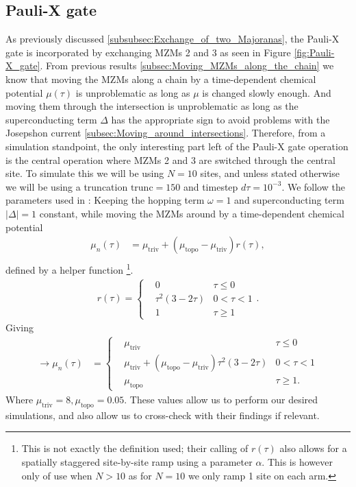 \subsection{Pauli-X gate}
As previously discussed \ref{subsubsec:Exchange_of_two_Majoranas}, the Pauli-X gate is incorporated by exchanging MZMs 2 and 3 as seen in Figure \ref{fig:Pauli-X_gate}. From previous results \ref{subsec:Moving_MZMs_along_the_chain} we know that moving the MZMs along a chain by a time-dependent chemical potential $\mu(\tau)$ is unproblematic as long as $\mu$ is changed slowly enough. And moving them through the intersection is unproblematic as long as the superconducting term $\Delta$ has the appropriate sign to avoid problems with the Josepshon current \ref{subsec:Moving_around_intersections}. Therefore, from a simulation standpoint, the only interesting part left of the Pauli-X gate operation is the central operation where MZMs 2 and 3 are switched through the central site. To simulate this we will be using $N = 10$ sites, and unless stated otherwise we will be using a truncation $\text{trunc} = 150$ and timestep $d\tau = 10^{-3}$. We follow the parameters used in \cite{sahuNoisyBraidingMajorana2026}: Keeping the hopping term $\omega = 1$ and superconducting term $|\Delta| = 1$ constant, while moving the MZMs around by a time-dependent chemical potential 
\begin{align}
  \mu_n(\tau) &= \mu_\text{triv} + \left(\mu_\text{topo} - \mu_\text{triv} \right) r(\tau), \\
\end{align}
defined by a helper function \footnote{This is not exactly the definition \cite{sahuNoisyBraidingMajorana2026} used; their calling of $r(\tau)$ also allows for a spatially staggered site-by-site ramp using a parameter $\alpha$. This is however only of use when $N > 10$ as for $N=10$ we only ramp 1 site on each arm.}. 
\begin{align}
  r(\tau) = \left\{
  \begin{aligned}
    & 0 & \tau \leq 0 \\
    & \tau^2 (3 - 2 \tau)  & 0 < \tau < 1\\
    & 1 & \tau \geq 1
  \end{aligned} \label{eq:r(tau)_Pauli_x}
  \right. .
\end{align}
Giving 
\begin{align}
  \to \mu_n(\tau) &= \left\{
  \begin{aligned}
    & \mu_\text{triv}  & \tau \leq 0 \\
    & \mu_\text{triv} + \left( \mu_\text{topo} - \mu_\text{triv} \right) \tau^2 (3 - 2 \tau)  & 0 < \tau < 1\\
    & \mu_\text{topo} & \tau \geq 1.
  \end{aligned} 
\right. \label{eq:mu(tau)_Pauli_x}
\end{align}
Where $\mu_\text{triv} = 8, \mu_\text{topo} = 0.05$. These values allow us to perform our desired simulations, and also allow us to cross-check with their findings if relevant.

